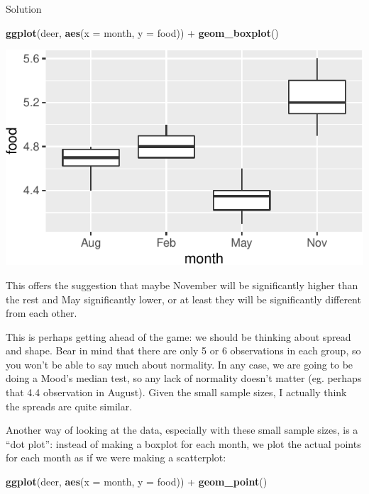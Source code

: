 \documentclass[]{tufte-book}
\newenvironment{Shaded}{}{}
\newcommand{\DataTypeTok}[1]{\textcolor[rgb]{0.56,0.13,0.00}{#1}}
\newcommand{\KeywordTok}[1]{\textcolor[rgb]{0.00,0.44,0.13}{\textbf{#1}}}
\newcommand{\NormalTok}[1]{#1}
\newcommand{\OperatorTok}[1]{\textcolor[rgb]{0.40,0.40,0.40}{#1}}
\newcommand{\StringTok}[1]{\textcolor[rgb]{0.25,0.44,0.63}{#1}}
\theoremstyle{definition}
\theoremstyle{definition}
\theoremstyle{definition}
\theoremstyle{remark}
\begin{document}
Solution

\begin{Shaded}
\begin{Highlighting}[]
\KeywordTok{ggplot}\NormalTok{(deer, }\KeywordTok{aes}\NormalTok{(}\DataTypeTok{x =}\NormalTok{ month, }\DataTypeTok{y =}\NormalTok{ food)) }\OperatorTok{+}\StringTok{ }\KeywordTok{geom_boxplot}\NormalTok{()}
\end{Highlighting}
\end{Shaded}

\includegraphics{10-analysis-of-variance_files/figure-latex/unnamed-chunk-12-1}

This offers the suggestion that maybe November will be significantly
higher than the rest and May significantly lower, or at least they will
be significantly different from each other.

This is perhaps getting ahead of the game: we should be thinking about
spread and shape. Bear in mind that there are only 5 or 6 observations
in each group, so you won't be able to say much about normality. In any
case, we are going to be doing a Mood's median test, so any lack of
normality doesn't matter (eg. perhaps that 4.4 observation in August).
Given the small sample sizes, I actually think the spreads are quite
similar.

Another way of looking at the data, especially with these small sample
sizes, is a ``dot plot'': instead of making a boxplot for each month, we
plot the actual points for each month as if we were making a
scatterplot:

\begin{Shaded}
\begin{Highlighting}[]
\KeywordTok{ggplot}\NormalTok{(deer, }\KeywordTok{aes}\NormalTok{(}\DataTypeTok{x =}\NormalTok{ month, }\DataTypeTok{y =}\NormalTok{ food)) }\OperatorTok{+}\StringTok{ }\KeywordTok{geom_point}\NormalTok{()}
\end{Highlighting}
\end{Shaded}
\end{document}

